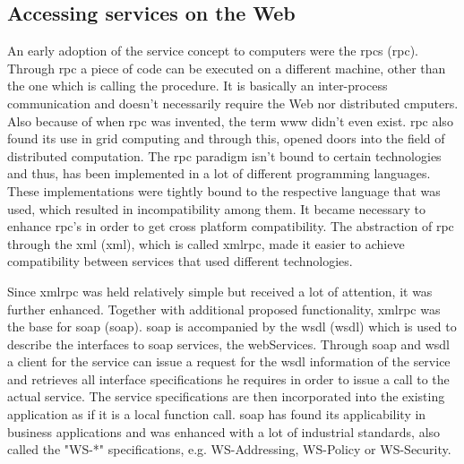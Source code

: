 \subsection{Accessing services on the Web}
An early adoption of the service concept to computers were the \textrm{\acrlong{rpc}s (\acrshort{rpc})}\cite{Birrell:1984:IRP:2080.357392}.
Through \textrm{\acrshort{rpc}} a piece of code can be executed on a different machine, other than the one which is calling the procedure.
It is basically an inter-process communication and doesn't necessarily require the Web nor distributed cmputers.
Also because of when \textrm{\acrshort{rpc}} was invented, the term \textrm{\gls{www}} didn't even exist. 
\textrm{\acrshort{rpc}} also found its use in grid computing\cite{seymour2002overview} and through this, opened doors into the field of distributed computation.
The \textrm{\acrshort{rpc}} paradigm isn't bound to certain technologies and thus, has been implemented in a lot of different programming languages.
These implementations were tightly bound to the respective language that was used, which resulted in incompatibility among them.
It became necessary to enhance \textrm{\acrshort{rpc}}'s in order to get cross platform compatibility.
The abstraction of \textrm{\acrshort{rpc}} through the \textrm{\acrlong{xml}} (\textrm{\acrshort{xml}})\cite{bray1998extensible}, which is called \textrm{\acrshort{xmlrpc}}, made it easier to achieve compatibility between services that used different technologies.

Since \textrm{\acrshort{xmlrpc}} was held relatively simple but received a lot of attention, it was further enhanced.
Together with additional proposed functionality, \textrm{\acrshort{xmlrpc}} was the base for \textrm{\acrlong{soap}} (\textrm{\acrshort{soap}})\cite{box2000simple}.
\textrm{\acrshort{soap}} is accompanied by the \textrm{\acrlong{wsdl} (\acrshort{wsdl})}\cite{christensen2001web} which is used to describe the interfaces to \acrshort{soap} services, the \textrm{\glspl{webService}}.
Through \textrm{\acrshort{soap}} and \textrm{\acrshort{wsdl}} a client for the service can issue a request for the \textrm{\acrshort{wsdl}} information of the service and retrieves all interface specifications he requires in order to issue a call to the actual service.
The service specifications are then incorporated into the existing application as if it is a local function call.
\textrm{\acrshort{soap}} has found its applicability in business applications\cite{journals/itpro/BarrosD06} and was enhanced with a lot of industrial standards, also called the "WS-*" specifications, e.g. WS-Addressing, WS-Policy or WS-Security.


